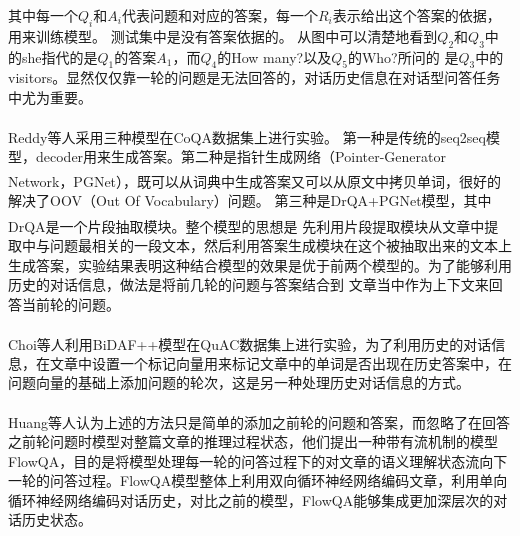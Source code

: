 \documentclass{article}
\makeatletter
\newenvironment{figurehere}
 {\def\@captype{figure}}
 {}
\newcommand{\upcite}[1]{\textsuperscript{\textsuperscript{\cite{#1}}}}
\makeatother
\begin{document}
其中每一个$Q_i$和$A_i$代表问题和对应的答案，每一个$R_i$表示给出这个答案的依据，用来训练模型。
测试集中是没有答案依据的。
从图中可以清楚地看到$Q_2$和$Q_3$中的she指代的是$Q_1$的答案$A_1$，而$Q_4$的How many?以及$Q_5$的Who?所问的
是$Q_3$中的visitors。显然仅仅靠一轮的问题是无法回答的，对话历史信息在对话型问答任务中尤为重要。

Reddy等人\upcite{CoQA}采用三种模型在CoQA数据集上进行实验。
第一种是传统的seq2seq模型，decoder用来生成答案。第二种是指针生成网络（Pointer-Generator Network\upcite{PGNet}，PGNet），既可以从词典中生成答案又可以从原文中拷贝单词，很好的解决了OOV（Out Of Vocabulary）问题。
第三种是DrQA+PGNet模型，其中DrQA\upcite{DrQA}是一个片段抽取模块。整个模型的思想是
先利用片段提取模块从文章中提取中与问题最相关的一段文本，然后利用答案生成模块在这个被抽取出来的文本上
生成答案，实验结果表明这种结合模型的效果是优于前两个模型的。为了能够利用历史的对话信息，做法是将前几轮的问题与答案结合到
文章当中作为上下文来回答当前轮的问题。

Choi等人\upcite{QuAC}利用BiDAF++\upcite{Clark}模型在QuAC数据集上进行实验，为了利用历史的对话信息，在文章中设置一个标记向量用来标记文章中的单词是否出现在历史答案中，在问题向量的基础上添加问题的轮次，这是另一种处理历史对话信息的方式。

Huang等人\upcite{FlowQA}认为上述的方法只是简单的添加之前轮的问题和答案，而忽略了在回答之前轮问题时模型对整篇文章的推理过程状态，他们提出一种带有流机制的模型FlowQA，目的是将模型处理每一轮的问答过程下的对文章的语义理解状态流向下一轮的问答过程。FlowQA模型整体上利用双向循环神经网络编码文章，利用单向循环神经网络编码对话历史，对比之前的模型，FlowQA能够集成更加深层次的对话历史状态。
\end{document}
